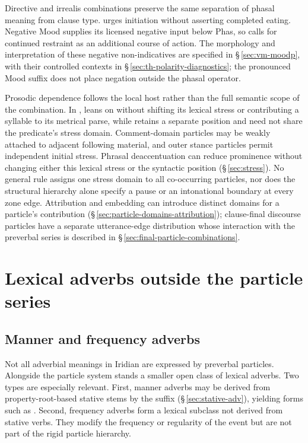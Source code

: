 Directive and irrealis combinations preserve the same separation of phasal
meaning from clause type.  
urges initiation without asserting completed eating. Negative Mood supplies
its licensed negative input below Phas, so  calls for
continued restraint as an additional course of action. The morphology and
interpretation of these negative non-indicatives are specified in
§\,\ref{sec:vm-moodp}, with their controlled contexts in
§\,\ref{sec:th-polarity-diagnostics}; the pronounced Mood suffix does not
place negation outside the phasal operator.

Prosodic dependence follows the local host rather than the full semantic
scope of the combination. In ,  leans
on  without shifting its lexical stress or contributing a
syllable to its metrical parse, while  retains a separate position
and need not share the predicate's stress domain.
Comment-domain particles may be weakly attached to adjacent following
material, and outer stance particles permit independent initial stress.
Phrasal deaccentuation can reduce prominence without changing either this
lexical stress or the syntactic position (§\,\ref{sec:stress}). No general
rule assigns one stress domain to all co-occurring particles, nor does the
structural hierarchy alone specify a pause or an intonational boundary at
every zone edge. Attribution and embedding can introduce distinct domains
for a particle's contribution
(§\,\ref{sec:particle-domains-attribution}); clause-final discourse particles
have a separate utterance-edge distribution whose interaction with the
preverbal series is described in
§\,\ref{sec:final-particle-combinations}.

\section{Lexical adverbs outside the particle series}
\label{sec:lex-adv}

\subsection{Manner and frequency adverbs}

Not all adverbial meanings in Iridian are expressed by preverbal particles.
Alongside the particle system stands a smaller open class of lexical adverbs.
Two types are especially relevant. First, manner adverbs may be derived from
property-root-based stative stems by the suffix 
(§\,\ref{sec:stative-adv}), yielding forms such as 
. Second, frequency adverbs form a lexical subclass not derived
from stative verbs. They modify the frequency or regularity of the event but
are not part of the rigid particle hierarchy.

